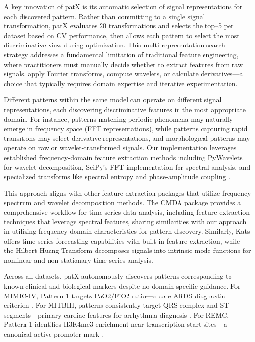 \documentclass[11pt]{article}
\begin{document}
A key innovation of patX is its automatic selection of signal representations
for each discovered pattern.
Rather than committing to a single signal transformation, patX evaluates 20
transformations and selects the top--5 per dataset based on CV performance,
then allows each pattern to select the most discriminative view during optimization.
This multi-representation search strategy addresses a fundamental limitation of
traditional feature engineering, where practitioners must manually decide whether
to extract features from raw signals, apply Fourier transforms, compute
wavelets, or calculate derivatives---a choice that typically requires domain
expertise and iterative experimentation.

Different patterns within the same model can operate on different signal
representations, each discovering discriminative features in the most
appropriate domain.
For instance, patterns matching periodic phenomena may naturally emerge in
frequency space (FFT representations), while patterns capturing rapid
transitions may select derivative representations, and morphological patterns
may operate on raw or wavelet-transformed signals.
Our implementation leverages established frequency-domain feature extraction
methods including PyWavelets \cite{lee2019pywavelets} for wavelet
decomposition, SciPy's FFT implementation \cite{virtanen2020scipy} for spectral
analysis, and specialized transforms like spectral entropy \cite{cohen2019spectral}
and phase-amplitude coupling \cite{tort2010measuring}.

This approach aligns with other feature extraction packages that utilize
frequency spectrum and wavelet decomposition methods.
The CMDA package \cite{ghalati2023cmda} provides a comprehensive workflow for
time series data analysis, including feature extraction techniques that leverage
spectral features, sharing similarities with our approach in utilizing
frequency-domain characteristics for pattern discovery.
Similarly, Kats \cite{li2022kats} offers time series forecasting capabilities
with built-in feature extraction, while the Hilbert-Huang Transform
\cite{huang1998empirical} decomposes signals into intrinsic mode functions for
nonlinear and non-stationary time series analysis.

Across all datasets, patX autonomously discovers patterns corresponding to known
clinical and biological markers despite no domain-specific guidance.
For MIMIC-IV, Pattern 1 targets PaO2/FiO2 ratio---a core ARDS diagnostic
criterion \cite{ranieri2012acute}.
For MITBIH, patterns consistently target QRS complex and ST segments---primary
cardiac features for arrhythmia diagnosis \cite{anbalagan2023analysis}.
For REMC, Pattern 1 identifies H3K4me3 enrichment near transcription start
sites---a canonical active promoter mark \cite{heintzman2007distinct, barski2007high}.
\end{document}
